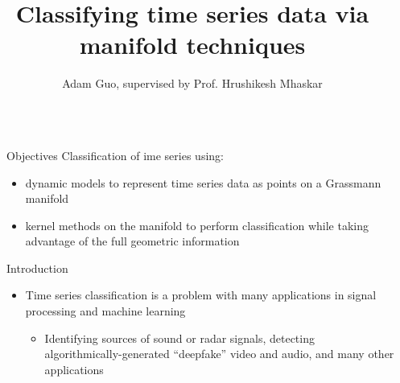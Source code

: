 \documentclass[final]{beamer}
\title{Classifying time series data via manifold techniques} %
\author{Adam Guo, supervised by Prof. Hrushikesh Mhaskar} %
\institute{Pomona College ('22), Claremont Graduate University} %
\newlength{\sepwid}
\newlength{\onecolwid}
\begin{document}

\setlength{\belowcaptionskip}{2ex} %
\setlength\belowdisplayshortskip{2ex} %

\begin{frame}[t] %

\begin{columns}[t] %

\begin{column}{\sepwid}\end{column} %

\begin{column}{\onecolwid} %


\begin{alertblock}{Objectives}
   Classification of ime series using:
    \begin{itemize}
        \item dynamic models to represent time series data as points on a Grassmann manifold
        \item  kernel methods on the manifold to perform classification while taking
            advantage of the full geometric information
    \end{itemize}
\end{alertblock}


\begin{block}{Introduction}
    \begin{itemize}
        \item Time series classification is a  problem with many applications in signal processing and machine
            learning
\begin{itemize}
\item Identifying sources of sound or radar signals, detecting algorithmically-generated
            ``deepfake'' video and audio, and many other applications


\end{itemize}
\end{itemize}
\end{block}
\end{column}
\end{columns}
\end{frame}
\end{document}
